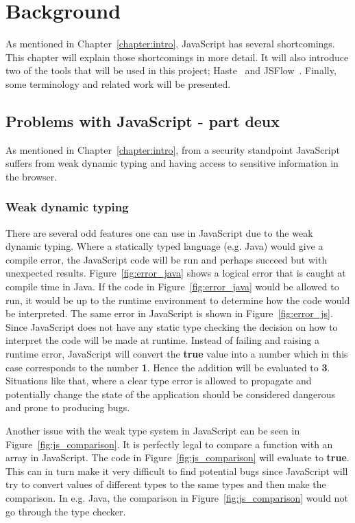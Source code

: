 \chapter{Background}
As mentioned in Chapter~\ref{chapter:intro}, JavaScript has several shortcomings. This chapter will explain those shortcomings in more detail. It will also introduce two of the tools that will be used in this project; Haste~\cite{haste-lang} and JSFlow~\cite{jsflow,jsflow-csf12,jsflow-sac14}. Finally, some terminology and related work will be presented.

\section{Problems with JavaScript - part deux}
As mentioned in Chapter~\ref{chapter:intro}, from a security standpoint JavaScript suffers from weak dynamic typing and having access to sensitive information in the browser.
\subsection{Weak dynamic typing}
\label{chapter:weak-dynamic-typing}
There are several odd features one can use in JavaScript due to the weak dynamic typing. Where a statically typed language (e.g. Java) would give a compile error, the JavaScript code will be run and perhaps succeed but with unexpected results. Figure~\ref{fig:error_java} shows a logical error that is caught at compile time in Java. If the code in Figure~\ref{fig:error_java} would be allowed to run, it would be up to the runtime environment to determine how the code would be interpreted. The same error in JavaScript is shown in Figure~\ref{fig:error_js}. Since JavaScript does not have any static type checking the decision on how to interpret the code will be made at runtime. Instead of failing and raising a runtime error, JavaScript will convert the \textbf{true} value into a number which in this case corresponds to the number \textbf{1}. Hence the addition will be evaluated to \textbf{3}. Situations like that, where a clear type error is allowed to propagate and potentially change the state of the application should be considered dangerous and prone to producing bugs.

Another issue with the weak type system in JavaScript can be seen in Figure~\ref{fig:js_comparison}. It is perfectly legal to compare a function with an array in JavaScript. The code in Figure~\ref{fig:js_comparison} will evaluate to \textbf{true}. This can in turn make it very difficult to find potential bugs since JavaScript will try to convert values of different types to the same types and then make the comparison. In e.g. Java, the comparison in Figure~\ref{fig:js_comparison} would not go through the type checker.

